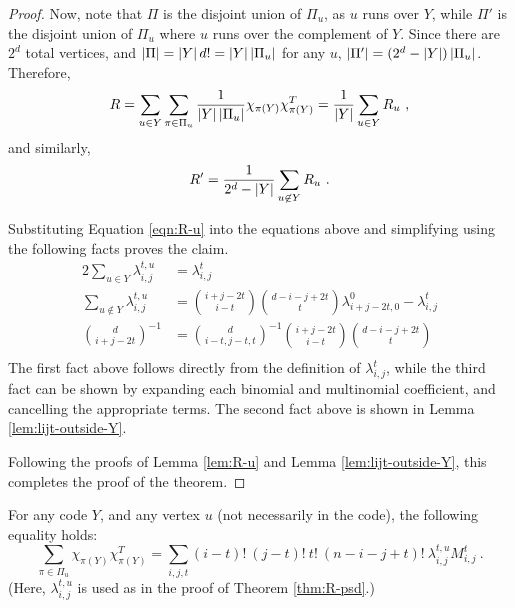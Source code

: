 \documentclass{report}
\newcommand{\lijt}{\lambda_{i, j}^t}
\newcommand{\lijtu}{\lambda_{i, j}^{t, u}}
\newcommand{\Mijt}{M_{i, j}^t}
\newcommand{\chipiY}{\chi_{\pi(Y)}}
\begin{document}
\begin{proof}
      Now, note that $\Pi$ is the disjoint union of $\Pi_u$, as $u$ runs over
      $Y$, while $\Pi'$ is the disjoint union of $\Pi_u$ where $u$ runs over the
      complement of $Y$.  Since there are $2^d$ total vertices, and $\left\lvert \Pi \right\rvert =
      \left\lvert Y \right\rvert d! = \left\lvert Y \right\rvert \left\lvert \Pi_u \right\rvert$ for any $u$, $\left\lvert \Pi' \right\rvert = (2^d -
      \left\lvert Y \right\rvert) \left\lvert \Pi_u \right\rvert$.  Therefore,
      $$
        R =
          \sum_{u \in Y} \sum_{\pi \in \Pi_u} \frac{1}{\abs{Y} \abs{\Pi_u}}
          \chipiY \chipiY^T
          = \frac{1}{\abs{Y}} \sum_{u \in Y} R_u \ ,
      $$
      and similarly,
      $$
        R' = \frac{1}{2^d - \left\lvert Y \right\rvert} \sum_{u \not\in Y} R_u \ .
      $$

      Substituting Equation \ref{eqn:R-u} into the equations above and
      simplifying using the following facts proves the claim.
      \begin{alignat}{2}
        \sum_{u \in Y} \lambda_{i, j}^{t, u} &= \lijt \\
        \sum_{u \not\in Y} \lambda_{i, j}^{t, u} &=
          \binom{i + j - 2t}{i - t} \binom{d - i - j + 2t}{t} \lambda_{i + j -
          2t, 0}^0 - \lijt \\
        \binom{d}{i+j-2t}^{-1} &=
          \binom{d}{i-t, j-t, t}^{-1}\binom{i+j-2t}{i-t}\binom{d-i-j+2t}{t} \\
      \end{alignat}
      The first fact above follows directly from the definition of $\lijt$,
      while the third fact can be shown by expanding each binomial and
      multinomial coefficient, and cancelling the appropriate terms.  The second
      fact above is shown in Lemma \ref{lem:lijt-outside-Y}.

      Following the proofs of Lemma \ref{lem:R-u} and Lemma
      \ref{lem:lijt-outside-Y}, this completes the proof of the theorem.

    \end{proof}

    \begin{lem}\label{lem:R-u}
      For any code $Y$, and any vertex $u$ (not necessarily in the code), the
      following equality holds:
      $$
        \sum_{\pi \in \Pi_u} \chipiY \chipiY^T =
        \sum_{i, j, t} (i-t)!\ (j-t)!\ t!\ (n-i-j+t)!\ \lijtu \Mijt \ .
      $$
      (Here, $\lambda_{i, j}^{t, u}$ is used as in the proof of Theorem
      \ref{thm:R-psd}.)
    \end{lem}
\end{document}
